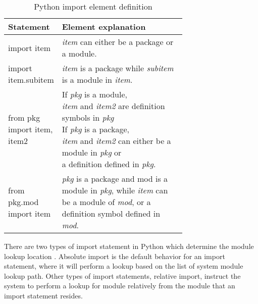 \begin{table}[ht]
    \centering
    \begin{tabular}{ |l|p{0.7\linewidth}| }
        \hline
        Statement                   & Element explanation                                                                                                                                                 \\
        \hline
        import item                 & \textit{item} can either be a package or a module.                                                                                                                  \\
        \hline
        import item.subitem         & \textit{item} is a package while \textit{subitem} is a module in \textit{item}.                                                                                     \\
        \hline
        from pkg import item, item2 &
        \makecell[l]
        {If \textit{pkg} is a module,                                                                                                                                                                     \\ \textit{item} and \textit{item2} are definition symbols in \textit{pkg}                                                            \\
            If \textit{pkg} is a package,                                                                                                                                                                 \\ \textit{item} and \textit{item2} can either be a module in \textit{pkg} or \\ a definition defined in \textit{pkg}.
        }                                                                                                                                                                                                 \\
        \hline
        from pkg.mod import item    & \textit{pkg} is a package and mod is a module in \textit{pkg}, while \textit{item} can be a module of \textit{mod}, or a definition symbol defined in \textit{mod}. \\
        \hline
    \end{tabular}
    \caption{Python import element definition}
    \label{table:python-import-def}
\end{table}

There are two types of import statement in Python which determine the module lookup location \cite{pep328}. Absolute import is the default behavior for an import statement, where it will perform a lookup based on the list of system module lookup path. Other types of import statements, relative import, instruct the system to perform a lookup for module relatively from the module that an import statement resides.

